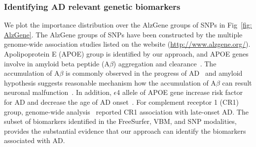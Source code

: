 \subsubsection{Identifying AD relevant genetic biomarkers}
We plot the importance distribution over the AlzGene groups of SNPs in Fig~\ref{fig: AlzGene}. The AlzGene groups of SNPs have been constructed by the multiple genome-wide association studies listed on the website (\url{http://www.alzgene.org/}). Apolipoprotein E (APOE) group is identified by our approach, and APOE genes involve in amyloid beta peptide (A$\beta$) aggregation and clearance~\cite{kim2009role}. The accumulation of A$\beta$ is commonly observed in the progress of AD~\cite{chen2017amyloid} and amyloid hypothesis suggests reasonable mechanism how the accumulation of A$\beta$ can result neuronal malfunction~\cite{hardy2002amyloid}. In addition, $\epsilon$4 allele of APOE gene increase risk factor for AD and decrease the age of AD onset~\cite{corder1993gene}. For complement receptor 1 (CR1) group, genome-wide analysis~\cite{lambert2009genome} reported CR1 association with late-onset AD. The subset of biomarkers identified in the FreeSurfer, VBM, and SNP modalities, provides the substantial evidence that our approach can identify the biomarkers associated with AD.
